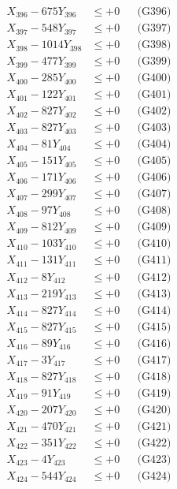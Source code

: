 \documentclass[a4paper,10pt]{article}
\begin{document}
{\begin{align}
X_{396} - 675Y_{396} &\leq +0 && \text{(G396)} \\
X_{397} - 548Y_{397} &\leq +0 && \text{(G397)} \\
X_{398} - 1014Y_{398} &\leq +0 && \text{(G398)} \\
X_{399} - 477Y_{399} &\leq +0 && \text{(G399)} \\
X_{400} - 285Y_{400} &\leq +0 && \text{(G400)} \\
\allowbreak
X_{401} - 122Y_{401} &\leq +0 && \text{(G401)} \\
X_{402} - 827Y_{402} &\leq +0 && \text{(G402)} \\
X_{403} - 827Y_{403} &\leq +0 && \text{(G403)} \\
X_{404} - 81Y_{404} &\leq +0 && \text{(G404)} \\
X_{405} - 151Y_{405} &\leq +0 && \text{(G405)} \\
X_{406} - 171Y_{406} &\leq +0 && \text{(G406)} \\
X_{407} - 299Y_{407} &\leq +0 && \text{(G407)} \\
X_{408} - 97Y_{408} &\leq +0 && \text{(G408)} \\
X_{409} - 812Y_{409} &\leq +0 && \text{(G409)} \\
X_{410} - 103Y_{410} &\leq +0 && \text{(G410)} \\
\allowbreak
X_{411} - 131Y_{411} &\leq +0 && \text{(G411)} \\
X_{412} - 8Y_{412} &\leq +0 && \text{(G412)} \\
X_{413} - 219Y_{413} &\leq +0 && \text{(G413)} \\
X_{414} - 827Y_{414} &\leq +0 && \text{(G414)} \\
X_{415} - 827Y_{415} &\leq +0 && \text{(G415)} \\
X_{416} - 89Y_{416} &\leq +0 && \text{(G416)} \\
X_{417} - 3Y_{417} &\leq +0 && \text{(G417)} \\
X_{418} - 827Y_{418} &\leq +0 && \text{(G418)} \\
X_{419} - 91Y_{419} &\leq +0 && \text{(G419)} \\
X_{420} - 207Y_{420} &\leq +0 && \text{(G420)} \\
\allowbreak
X_{421} - 470Y_{421} &\leq +0 && \text{(G421)} \\
X_{422} - 351Y_{422} &\leq +0 && \text{(G422)} \\
X_{423} - 4Y_{423} &\leq +0 && \text{(G423)} \\
X_{424} - 544Y_{424} &\leq +0 && \text{(G424)} \\

\end{align}}
\end{document}
